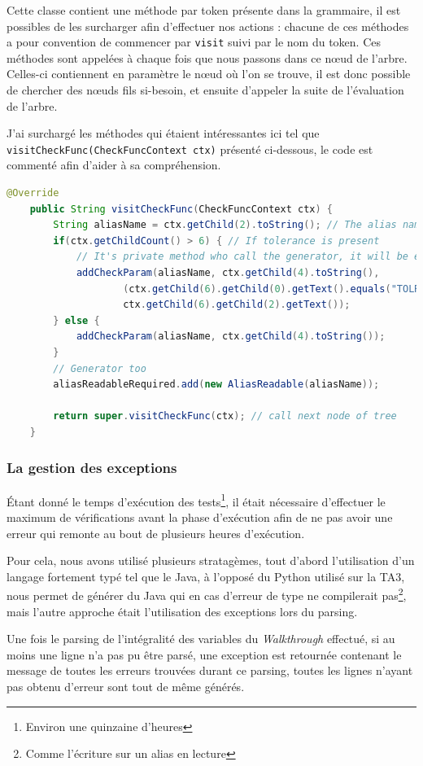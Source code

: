 	Cette classe contient une méthode par token présente dans la grammaire, il est possibles de les surcharger afin d'effectuer nos actions : chacune de ces
	méthodes a pour convention de commencer par \texttt{visit} suivi par le nom du token. Ces méthodes sont appelées à chaque fois que nous passons dans ce n\oe{}ud de l'arbre. Celles-ci contiennent en paramètre le n\oe{}ud où l'on se trouve, il est donc possible de chercher des nœuds fils si-besoin, et ensuite d'appeler la suite de l'évaluation de l'arbre. 

	J'ai surchargé les méthodes qui étaient intéressantes ici tel que \texttt{visitCheckFunc(CheckFuncContext ctx)} présenté ci-dessous, le code est commenté afin d'aider à sa compréhension.
\begin{lstlisting}[language=Java, caption=Surcharge de \texttt{visitCheckFunc}]
	@Override
	public String visitCheckFunc(CheckFuncContext ctx) {
		String aliasName = ctx.getChild(2).toString(); // The alias name to check
		if(ctx.getChildCount() > 6) { // If tolerance is present
			// It's private method who call the generator, it will be explained after
			addCheckParam(aliasName, ctx.getChild(4).toString(), 
					(ctx.getChild(6).getChild(0).getText().equals("TOLRES") ? TolType.TOLRES : TolType.TOLPER), 
					ctx.getChild(6).getChild(2).getText());
		} else {
			addCheckParam(aliasName, ctx.getChild(4).toString());
		}
		// Generator too
		aliasReadableRequired.add(new AliasReadable(aliasName));

		return super.visitCheckFunc(ctx); // call next node of tree
	}
\end{lstlisting}
		\subsubsection{La gestion des exceptions}
\'Etant donné le temps d'exécution des tests\footnote{Environ une quinzaine d'heures}, il était nécessaire d'effectuer le maximum de vérifications avant la phase d'exécution afin de ne pas avoir une erreur qui remonte au bout de plusieurs heures d'exécution. 

Pour cela, nous avons utilisé plusieurs stratagèmes, tout d'abord l'utilisation d'un langage fortement typé tel que le Java, à l'opposé du Python utilisé sur la TA3, nous permet de générer du Java qui en cas d'erreur de type ne compilerait pas\footnote{Comme l'écriture sur un alias en lecture}, mais l'autre approche était l'utilisation des exceptions lors du parsing.

Une fois le parsing de l'intégralité des variables du \textit{Walkthrough} effectué, si au moins une ligne n'a pas pu être parsé, une exception est retournée
contenant le message de toutes les erreurs trouvées durant ce parsing, toutes les lignes n'ayant pas obtenu d'erreur sont tout de même générés.

